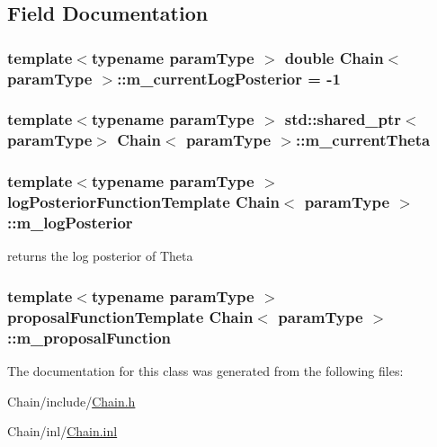 \subsection{Field Documentation}
\hypertarget{classChain_a1ce0a9a0fa6263b3285696a856ce6f4c}{
\subsubsection[{m\_\-currentLogPosterior}]{\setlength{\rightskip}{0pt plus 5cm}template$<$typename paramType $>$ double {\bf Chain}$<$ paramType $>$::{\bf m\_\-currentLogPosterior} = -\/1}}
\label{classChain_a1ce0a9a0fa6263b3285696a856ce6f4c}
\hypertarget{classChain_a5c622bbc0157b867ec3cee1d398d8675}{
\subsubsection[{m\_\-currentTheta}]{\setlength{\rightskip}{0pt plus 5cm}template$<$typename paramType $>$ std::shared\_\-ptr$<$paramType$>$ {\bf Chain}$<$ paramType $>$::{\bf m\_\-currentTheta}}}
\label{classChain_a5c622bbc0157b867ec3cee1d398d8675}
\hypertarget{classChain_a00ed020668792957c11c7e8b6b9eb0bd}{
\subsubsection[{m\_\-logPosterior}]{\setlength{\rightskip}{0pt plus 5cm}template$<$typename paramType $>$ logPosteriorFunctionTemplate {\bf Chain}$<$ paramType $>$::{\bf m\_\-logPosterior}}}
\label{classChain_a00ed020668792957c11c7e8b6b9eb0bd}
returns the log posterior of Theta \hypertarget{classChain_aa674eece174b4da338182f4eee458b3e}{
\subsubsection[{m\_\-proposalFunction}]{\setlength{\rightskip}{0pt plus 5cm}template$<$typename paramType $>$ proposalFunctionTemplate {\bf Chain}$<$ paramType $>$::{\bf m\_\-proposalFunction}}}
\label{classChain_aa674eece174b4da338182f4eee458b3e}


The documentation for this class was generated from the following files:\begin{DoxyCompactItemize}
\item 
Chain/include/\hyperlink{Chain_8h}{Chain.h}\item 
Chain/inl/\hyperlink{Chain_8inl}{Chain.inl}\end{DoxyCompactItemize}
